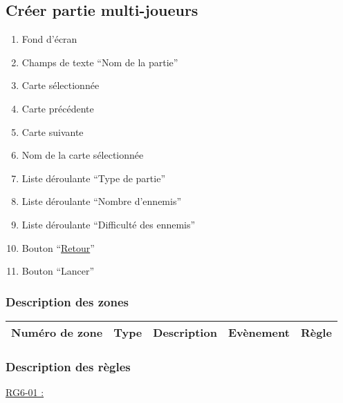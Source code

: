 \documentclass{report}
\begin{document}
\newpage

	\subsection{Créer partie multi-joueurs}
	
		\hypertarget{Creer partie multi-joueurs}{}
		\label{Creer partie multi-joueurs}
	
		\begin{center}
			
		\end{center}
		
		\begin{enumerate}
		  \item Fond d'écran
		  \item Champs de texte ``Nom de la partie''
		  \item Carte sélectionnée
		  \item Carte précédente
		  \item Carte suivante
		  \item Nom de la carte sélectionnée
		  \item Liste déroulante ``Type de partie''
		  \item Liste déroulante ``Nombre d'ennemis''
		  \item Liste déroulante ``Difficulté des ennemis''
		  \item Bouton ``\hyperlink{Page d'accueil}{Retour}''
		  \item Bouton ``Lancer'' 
		\end{enumerate}

		\subsubsection{Description des zones}
		
			\begin{tabular}{|c|c|c|c|c|} \hline
				Numéro de zone & Type  & Description & Evènement &	Règle \\\hline
			\end{tabular}
			
		\subsubsection{Description des règles}

			\underline{RG6-01 :}
				\begin{quote}
				
				\end{quote}	
	
\end{document}
